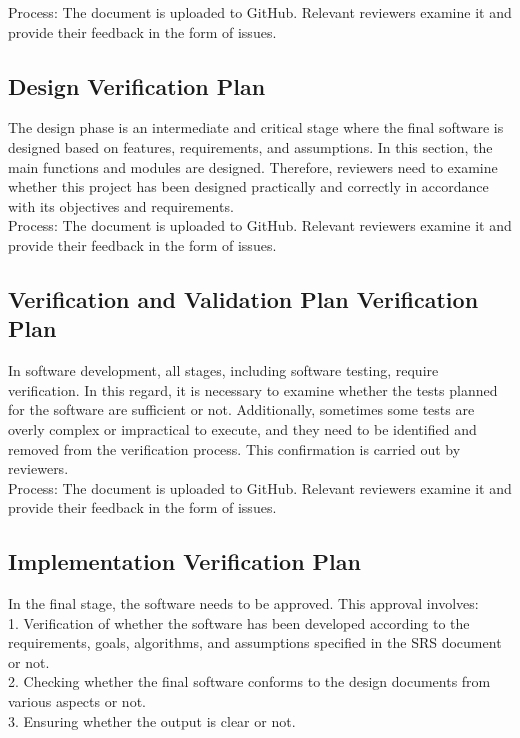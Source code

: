 \documentclass[12pt, titlepage]{article}
\begin{document}
Process: The document is uploaded to GitHub. Relevant reviewers examine it and provide their feedback in the form of issues.

\subsection{Design Verification Plan}
The design phase is an intermediate and critical stage where the final software is designed based on features, requirements, and assumptions. In this section, the main functions and modules are designed. Therefore, reviewers need to examine whether this project has been designed practically and correctly in accordance with its objectives and requirements.\\

Process: The document is uploaded to GitHub. Relevant reviewers examine it and provide their feedback in the form of issues.

\subsection{Verification and Validation Plan Verification Plan}
In software development, all stages, including software testing, require verification. In this regard, it is necessary to examine whether the tests planned for the software are sufficient or not. Additionally, sometimes some tests are overly complex or impractical to execute, and they need to be identified and removed from the verification process. This confirmation is carried out by reviewers.\\

Process: The document is uploaded to GitHub. Relevant reviewers examine it and provide their feedback in the form of issues.
\subsection{Implementation Verification Plan}



In the final stage, the software needs to be approved. This approval involves:\\
1. Verification of whether the software has been developed according to the requirements, goals, algorithms, and assumptions specified in the SRS document or not.\\
2. Checking whether the final software conforms to the design documents from various aspects or not.\\
3. Ensuring whether the output is clear or not.\\
\end{document}
